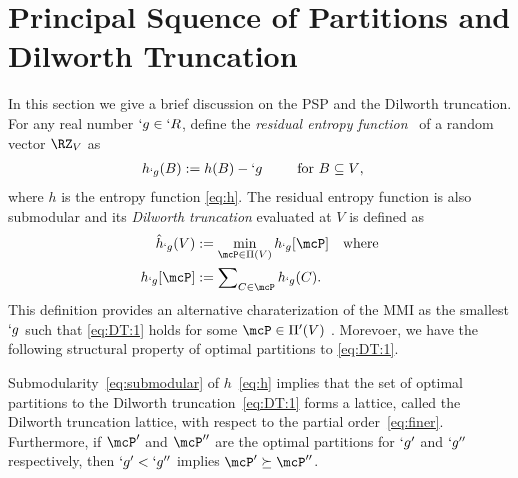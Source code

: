 \section{Principal Squence of Partitions and Dilworth Truncation}
\label{sec:dt}

\label{sec:PSP}
%
In this section we give a brief discussion on the PSP and the  Dilworth truncation.
For any real number $`g\in `R$, define the \emph{residual entropy function}~\cite{chan15mi} of a random vector $\RZ_V$ as
\begin{align}
	h_{`g}(B)&:= h(B)-`g \kern2.5em \text{for $B\subseteq V$}, \label{eq:residualH}
\end{align}
where $h$ is the entropy function \eqref{eq:h}.
The residual entropy function is also submodular and its \emph{Dilworth truncation} evaluated at $V$ is defined as~\cite{schrijver02}
\begin{subequations}
	\label{eq:DT}
\begin{align}
		\hat{h}_{`g}(V)&:= \min_{\mcP\in \Pi(V)} h_{`g}[\mcP] \kern1em\text{where}\label{eq:DT:1}\\
		h_{`g}[\mcP] &:= \sum\nolimits_{C\in \mcP} h_{`g}(C). \label{eq:DT:2} 
\end{align} 
\end{subequations}
This definition provides an alternative charaterization of the MMI as the smallest $`g$ such that
\eqref{eq:DT:1} holds for some $\mcP \in \Pi'(V)$ \cite{chan15mi}. Morevoer, we have the
following structural property of optimal partitions to \eqref{eq:DT:1}.
\begin{Proposition}
	\label{prop:plp}
	Submodularity~\eqref{eq:submodular} of $h$~\eqref{eq:h} implies that the set of optimal
	partitions to the Dilworth truncation~\eqref{eq:DT:1} forms a lattice, called the Dilworth
	truncation lattice, with respect to the partial order~\eqref{eq:finer}. Furthermore, if $\mcP'$
	and $\mcP''$ are the optimal partitions for $`g'$ and $`g''$ respectively, then $`g'<`g''$
	implies $\mcP'\succeq \mcP''$.
\end{Proposition}
